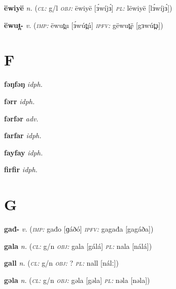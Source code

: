 \newentry
\headword\textbf{ëwiyë}  
\ipa{[ɜ́wíjɜ́]}
\synpos\textit{n.} 
\class(\textit{\textsc{cl:}} {g/l}
\object\textit{\textsc{obj:}} ëwiyë [ɜ́wíjɜ́]
\plural\textit{\textsc{pl:}} lëwiyë [lɜ́wíjɜ́])

\newentry
\headword\textbf{ëwut̪-}  
\ipa{[ɜwút̪-]}
\synpos\textit{v.} 
\imperative(\textit {\textsc{imp:}} ëwut̪u [ɜ́wút̪ú] \imperfective\textit{\textsc{ipfv:}} gëwut̪ë [gɜwút̪ɜ])


\section*{F}\label{F}

\newentry
\headword\textbf{fəŋfəŋ}  
\ipa{[fə́ŋfə́ŋ]}
\synpos\textit{idph.} 

\newentry
\headword\textbf{fərr}  
\ipa{[fərrr]}
\synpos\textit{idph.} 

\newentry
\headword\textbf{fərfər}  
\ipa{[fərfər]}
\synpos\textit{adv.} 

\newentry
\headword\textbf{farfar}  
\ipa{[fárfár]}
\synpos\textit{idph.} 

\newentry
\headword\textbf{fayfay}  
\ipa{[fájfáj]}
\synpos\textit{idph.} 

\newentry
\headword\textbf{firfir}  
\ipa{[fírfir]}
\synpos\textit{idph.} 

\section*{G}\label{G}

\newentry
\headword\textbf{gađ-}
\ipa{[ɡáð-]}
\synpos\textit{v.} 
\imperative(\textit {\textsc{imp:}} gađo [ɡáðó] 
\imperfective\textit{\textsc{ipfv:}} gagađa [gagáða])

\newentry
\headword\textbf{gala}  
\ipa{[gálá]}
\synpos\textit{n.} 
\class(\textit{\textsc{cl:}} {g/n}
\object\textit{\textsc{obj:}} gala [gálá]
\plural\textit{\textsc{pl:}} nala [nálá])

\newentry
\headword\textbf{gall}  
\ipa{[gálː]}
\synpos\textit{n.} 
\class(\textit{\textsc{cl:}} {g/n}
\object\textit{\textsc{obj:}} ?  
\plural\textit{\textsc{pl:}} nall [nálː])

\newentry
\headword\textbf{gəla}  
\ipa{[gəla]}
\synpos\textit{n.} 
\class(\textit{\textsc{cl:}} {g/n}
\object\textit{\textsc{obj:}} gəla [gəla]
\plural\textit{\textsc{pl:}} nəla [nəla])

